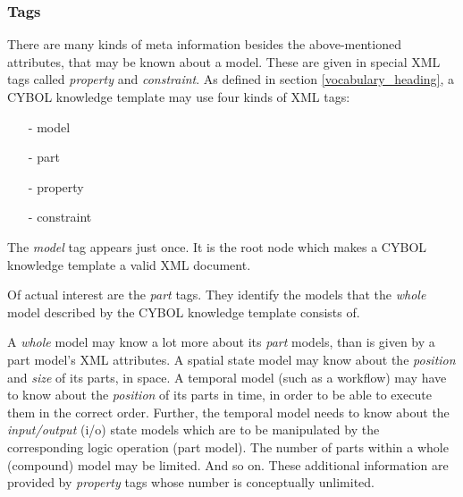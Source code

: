 %
%
%
%
%
%
%

\subsubsection{Tags}
\label{tags_heading}

There are many kinds of meta information besides the above-mentioned
attributes, that may be known about a model. These are given in special XML
tags called \emph{property} and \emph{constraint}. As defined in section
\ref{vocabulary_heading}, a CYBOL knowledge template may use four kinds of XML
tags:

\begin{itemize}
    \item[-] model
    \item[-] part
    \item[-] property
    \item[-] constraint
\end{itemize}

The \emph{model} tag appears just once. It is the root node which makes a CYBOL
knowledge template a valid XML document.

Of actual interest are the \emph{part} tags. They identify the models that the
\emph{whole} model described by the CYBOL knowledge template consists of.

A \emph{whole} model may know a lot more about its \emph{part} models, than is
given by a part model's XML attributes. A spatial state model may know about
the \emph{position} and \emph{size} of its parts, in space. A temporal model
(such as a workflow) may have to know about the \emph{position} of its parts in
time, in order to be able to execute them in the correct order. Further, the
temporal model needs to know about the \emph{input/output} (i/o) state models
which are to be manipulated by the corresponding logic operation (part model).
The number of parts within a whole (compound) model may be limited. And so on.
These additional information are provided by \emph{property} tags whose number
is conceptually unlimited.

